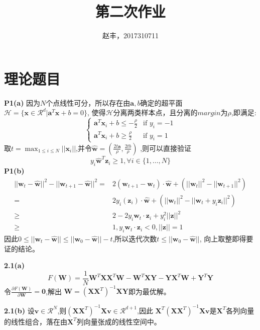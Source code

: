 \documentclass{article}
\begin{document}
\title{第二次作业}
\author{赵丰，2017310711}
\maketitle
\section{理论题目}
\textbf{P1(a)}
因为$N$个点线性可分，所以存在由$\bm{a},b$确定的超平面
$\mathcal{H}=\{\bm{x}\in \mathcal{R}^d|\bm{a}^T\bm{x}+b=0\}$,
使得$\mathcal{H}$分离两类样本点，且分离的$margin$为$\rho$,即满足:
\begin{equation}
\begin{cases}
\bm{a}^T \bm{x}_i + b \leq -\frac{\rho}{2} & \text{if } y_i=-1\\
\bm{a}^T \bm{x}_i + b \geq \frac{\rho}{2} & \text{if } y_i=1 
\end{cases}
\end{equation}
取$t=\displaystyle\max_{1\leq i\leq N} ||\bm{x}_i||$,并令$\hat{\bm{w}}=(\frac{2t\bm{a}}{\rho},\frac{2tb}{\rho})$
,则可以直接验证
\begin{equation}
y_i \hat{\bm{w}}^T \bm{z}_i \geq 1, \forall i\in \{1,\dots,N\}
\end{equation}
\textbf{P1(b)}
\begin{align}
||\bm{w}_t-\hat{\bm{w}}||^2-||\bm{w}_{t+1}-\hat{\bm{w}}||^2=& 2(\bm{w}_{t+1}-\bm{w}_{t})\cdot \hat{\bm{w}}+(||\bm{w}_{t}||^2-||\bm{w}_{t+1}||^2)\\
=& 2y_i(\bm{z}_i)\cdot \hat{\bm{w}} +(||\bm{w}_{t}||^2-||\bm{w}_{t}+y_i\bm{z}_i||^2)\\
\geq & 2 - 2y_i\bm{w}_t\cdot \bm{z}_i +y_i^2||\bm{z}||^2\\
\geq & 1,y_i\bm{w}_t\cdot \bm{z}_i<0,||\bm{z}||=1 
\end{align}
因此$0\leq ||\bm{w}_t-\hat{\bm{w}}|| \leq ||\bm{w}_0-\hat{\bm{w}}||-t$,所以迭代次数$t\leq ||\bm{w}_0-\hat{\bm{w}}||$,
向上取整即得要证的结论。

\textbf{2.1(a)}
\begin{equation}
F(\bm{W})=\frac{1}{N}\bm{W}^T\bm{X}\bm{X}^T\bm{W}-\bm{W}^T\bm{X}\bm{Y}-\bm{Y}\bm{X}^T\bm{W}+\bm{Y}^T\bm{Y}
\end{equation}
令$\frac{\partial F(\bm{W})}{\partial \bm{W}}=\bm{0}$,解出
$\bm{W}=(\bm{X}\bm{X}^T)^{-1}\bm{X}\bm{Y}$即为最优解。

\textbf{2.1(b)}
设$\bm{v}\in \mathcal{R}^N$,则$(\bm{X}\bm{X}^T)^{-1}\bm{X}\bm{v}\in \mathcal{R}^{d+1}$,因此
$\bm{X}^T(\bm{X}\bm{X}^T)^{-1}\bm{X}\bm{v}$是$\bm{X}^T$各列向量的线性组合，落在由$\bm{X}^T$列向量张成的线性空间中。
\end{document}
